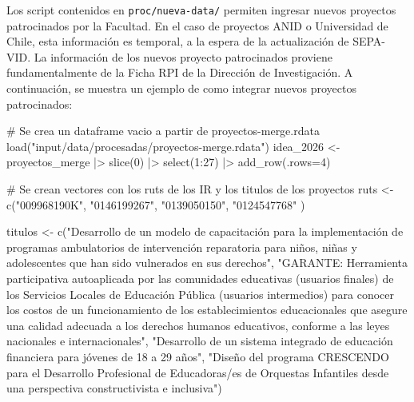 \documentclass[
  spanish,
  letterpaper,
  DIV=11,
  numbers=noendperiod]{scrreprt}
\newenvironment{Shaded}{\begin{snugshade}}{\end{snugshade}}
\newcommand{\AttributeTok}[1]{\textcolor[rgb]{0.40,0.45,0.13}{#1}}
\newcommand{\CommentTok}[1]{\textcolor[rgb]{0.37,0.37,0.37}{#1}}
\newcommand{\DecValTok}[1]{\textcolor[rgb]{0.68,0.00,0.00}{#1}}
\newcommand{\FunctionTok}[1]{\textcolor[rgb]{0.28,0.35,0.67}{#1}}
\newcommand{\NormalTok}[1]{\textcolor[rgb]{0.00,0.23,0.31}{#1}}
\newcommand{\OtherTok}[1]{\textcolor[rgb]{0.00,0.23,0.31}{#1}}
\newcommand{\SpecialCharTok}[1]{\textcolor[rgb]{0.37,0.37,0.37}{#1}}
\newcommand{\StringTok}[1]{\textcolor[rgb]{0.13,0.47,0.30}{#1}}
\begin{document}
Los script contenidos en \texttt{proc/nueva-data/} permiten ingresar
nuevos proyectos patrocinados por la Facultad. En el caso de proyectos
ANID o Universidad de Chile, esta información es temporal, a la espera
de la actualización de SEPA-VID. La información de los nuevos proyecto
patrocinados proviene fundamentalmente de la Ficha RPI de la Dirección
de Investigación. A continuación, se muestra un ejemplo de como integrar
nuevos proyectos patrocinados:

\begin{Shaded}
\begin{Highlighting}[]
\CommentTok{\# Se crea un dataframe vacio a partir de proyectos{-}merge.rdata}
\FunctionTok{load}\NormalTok{(}\StringTok{"input/data/procesadas/proyectos{-}merge.rdata"}\NormalTok{)}
\NormalTok{idea\_2026 }\OtherTok{\textless{}{-}}\NormalTok{ proyectos\_merge }\SpecialCharTok{|\textgreater{}}
  \FunctionTok{slice}\NormalTok{(}\DecValTok{0}\NormalTok{) }\SpecialCharTok{|\textgreater{}} \FunctionTok{select}\NormalTok{(}\DecValTok{1}\SpecialCharTok{:}\DecValTok{27}\NormalTok{) }\SpecialCharTok{|\textgreater{}} \FunctionTok{add\_row}\NormalTok{(}\AttributeTok{.rows=}\DecValTok{4}\NormalTok{)}



\CommentTok{\# Se crean vectores con los ruts de los IR y los titulos de los proyectos}
\NormalTok{ruts }\OtherTok{\textless{}{-}} \FunctionTok{c}\NormalTok{(}\StringTok{"009968190K"}\NormalTok{, }
                       \StringTok{"0146199267"}\NormalTok{, }
                       \StringTok{"0139050150"}\NormalTok{,}
                       \StringTok{"0124547768"}
\NormalTok{                       )}

\NormalTok{titulos }\OtherTok{\textless{}{-}} \FunctionTok{c}\NormalTok{(}\StringTok{"Desarrollo de un modelo de capacitación para la implementación de programas ambulatorios de intervención reparatoria para niños, niñas y adolescentes que han sido vulnerados en sus derechos"}\NormalTok{,}
             \StringTok{"GARANTE: Herramienta participativa autoaplicada por las comunidades educativas (usuarios finales) de los Servicios Locales de Educación Pública (usuarios intermedios) para conocer los costos de un funcionamiento de los establecimientos educacionales que asegure una calidad adecuada a los derechos humanos educativos, conforme a las leyes nacionales e internacionales"}\NormalTok{,}
             \StringTok{"Desarrollo de un sistema integrado de educación financiera para jóvenes de 18 a 29 años"}\NormalTok{,}
             \StringTok{"Diseño del programa CRESCENDO para el Desarrollo Profesional de Educadoras/es de Orquestas Infantiles desde una perspectiva constructivista e inclusiva"}\NormalTok{)}



\end{Highlighting}
\end{Shaded}
\end{document}
